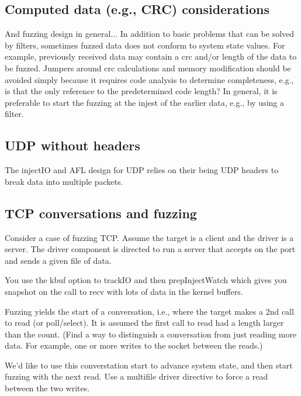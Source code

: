 \documentclass[titlepage]{article}
\begin{document}
\begin{appendices}
\subsection{Computed data (e.g., CRC) considerations}
And fuzzing design in general... In addition to basic problems that can be solved by filters, sometimes fuzzed data does not conform to system state values.
For example, previously received data may contain a crc and/or length of the data to be fuzzed.  Jumpers around crc calculations and memory modification should
be avoided simply because it requires code analysis to determine completeness, e.g., is that the only reference to the predetermined code length?  In general,
it is preferable to start the fuzzing at the injest of the earlier data, e.g., by using a filter.

\subsection{UDP without headers}
The injectIO and AFL design for UDP relies on their being UDP headers to break data into multiple packets.

\subsection{TCP conversations and fuzzing}
Consider a case of fuzzing TCP.  Assume the target is a client and the driver is a server.
The driver component is directed to run a server that accepts on the port and sends a given file of data.

You use the kbuf option to trackIO and then prepInjectWatch which gives you snapshot on the
call to recv with lots of data in the kernel buffers.

Fuzzing yields the start of a conversation, i.e., where the target makes a 2nd call to read (or poll/select).  It
is assumed the first call to read had a length larger than the count.  (Find a way to distinguish a conversation from
just reading more data.  For example, one or more writes to the socket between the reads.)

We'd like to use this converstation start to advance system state, and then start fuzzing with the next read.  Use a 
multifile driver directive to force a read between the two writes.


\end{appendices}
\end{document}
